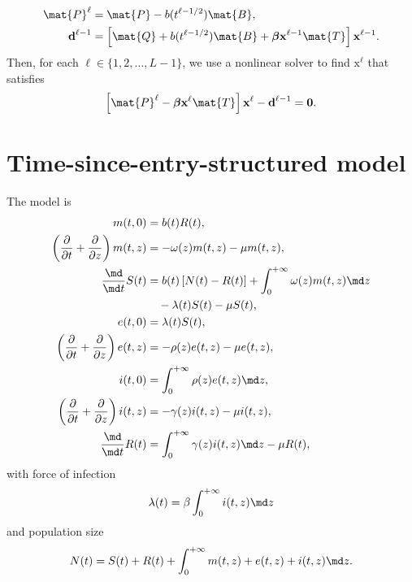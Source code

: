 \documentclass{jpmarticle}
\renewcommand{\vec}[1]{\boldsymbol{\mathrm{#1}}}
\begin{document}
\begin{equation}
  \begin{split}
    \mat{P}^{\ell} &=
    \mat{P} - b(t^{\ell - 1 / 2}) \mat{B},
    \\
    \vec{d}^{\ell - 1} &=
    \left[
      \mat{Q}
      + b(t^{\ell - 1 / 2}) \mat{B}
      + \vec{\beta} \vec{x}^{\ell - 1} \mat{T}
    \right] \vec{x}^{\ell - 1}.
  \end{split}
\end{equation}
Then, for each $\ell \in \{1, 2, \ldots, L - 1\}$,
we use a nonlinear solver to find $\vec{x}^{\ell}$ that satisfies
\begin{equation}
  \left[
    \mat{P}^{\ell}
    - \vec{\beta} \vec{x}^{\ell} \mat{T}
  \right] \vec{x}^{\ell}
  - \vec{d}^{\ell - 1}
  = \vec{0}.
\end{equation}


\section{Time-since-entry-structured model}

The model is
\begin{equation}
  \label{model_time_since_entry_structured}
  \begin{split}
    m(t, 0) &=
    b(t) R(t),
    \\
    \left(\frac{\partial}{\partial t}
      + \frac{\partial}{\partial z}\right)
    m(t, z) &=
    - \omega(z) m(t, z) - \mu m(t, z),
    \\
    \frac{\md}{\md t} S(t) &=
    b(t) \left[N(t) - R(t)\right]
    + \int_0^{+\infty} \omega(z) m(t, z) \md z
    \\ & \quad {}
    - \lambda(t) S(t) - \mu S(t),
    \\
    e(t, 0) &=
    \lambda(t) S(t),
    \\
    \left(\frac{\partial}{\partial t}
      + \frac{\partial}{\partial z}\right)
    e(t, z) &=
    - \rho(z) e(t, z) - \mu e(t, z),
    \\
    i(t, 0) &=
    \int_0^{+\infty} \rho(z) e(t, z) \md z,
    \\
    \left(\frac{\partial}{\partial t}
      + \frac{\partial}{\partial z}\right)
    i(t, z) &=
    - \gamma(z) i(t, z) - \mu i(t, z),
    \\
    \frac{\md}{\md t} R(t) &=
    \int_0^{+\infty} \gamma(z) i(t, z) \md z
    - \mu R(t),
  \end{split}
\end{equation}
with force of infection
\begin{equation}
  \lambda(t) = \beta \int_0^{+\infty} i(t, z) \md z
\end{equation}
and population size
\begin{equation}
  N(t) =
  S(t) + R(t)
  + \int_0^{+\infty} m(t, z) + e(t, z) + i(t, z) \md z.
\end{equation}
\end{document}
